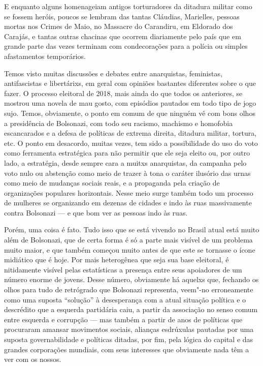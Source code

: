 E enquanto alguns homenageiam antigos torturadores da ditadura militar como se fossem heróis, poucos se lembram das tantas Cláudias, Marielles, pessoas mortas nos Crimes de Maio, no Massacre do Carandiru, em Eldorado dos Carajás, e tantas outras chacinas que ocorrem diariamente pelo país que em grande parte das vezes terminam com condecorações para a polícia ou simples afastamentos temporários.

Temos visto muitas discussões e debates entre anarquistas, feministas, antifascistas e libertárixs, em geral com opiniões bastantes diferentes sobre o que fazer. O processo eleitoral de 2018, mais ainda do que todos os anteriores, se mostrou uma novela de mau gosto, com episódios pautados em todo tipo de jogo sujo. Temos, obviamente, o ponto em comum de que ninguém vê com bons olhos a presidência de Bolsonazi, com todo seu racismo, machismo e homofobia escancarados e a defesa de políticas de extrema direita, ditadura militar, tortura, etc.
O ponto em desacordo, muitas vezes, tem sido a possibilidade do uso do voto como ferramenta estratégica para não permitir que ele seja eleito ou, por outro lado, a estratégia, desde sempre cara a muitxs anarquistas, da campanha pelo voto nulo ou abstenção como meio de trazer à tona o caráter ilusório das urnas como meio de mudanças sociais reais, e a propaganda pela criação de organizações populares horizontais. Nesse meio surge também todo um processo de mulheres se organizando em dezenas de cidades e indo às ruas massivamente contra Bolsonazi --- e que bom ver as pessoas indo às ruas.

Porém, uma coisa é fato. Tudo isso que se está vivendo no Brasil atual está muito além de Bolsonazi, que de certa forma é só a parte mais visível de um problema muito maior, e que também começou muito antes de que este se tornasse o ícone midiático que é hoje. Por mais heterogênea que seja sua base eleitoral, é nitidamente visível pelas estatísticas a presença entre seus apoiadores de um número enorme de jovens. Desse número, obviamente há aquelxs que, fechando os olhos para tudo de retrógrado que Bolsonazi representa, veem"-no erroneamente  como uma suposta ``solução'' à desesperança com a atual situação política e o descrédito que a esquerda partidária caiu, a partir da associação no senso comum entre esquerda e corrupção --- mas também a partir de anos de políticas que procuraram amansar movimentos sociais, alianças esdrúxulas pautadas por uma suposta governabilidade e políticas ditadas, por fim, pela lógica do capital e das grandes corporações mundiais, com seus interesses que obviamente nada têm a ver com os nossos.

